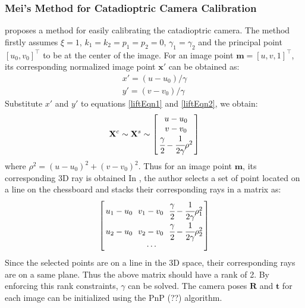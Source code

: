 \documentclass{report}
\begin{document}
\subsubsection{Mei's Method for Catadioptric Camera Calibration}
\cite{mei2007single} proposes a method for easily calibrating the catadioptric camera. The method firstly assumes $\xi = 1$, $k_1 = k_2 = p_1 = p_2 = 0$, $\gamma_1 = \gamma_2$ and the principal point $[u_0, v_0]^\top$ to be at the center of the image. For an image point $\mathbf{m} = [u, v, 1]^\top$, its corresponding normalized image point $\mathbf{x}'$ can be obtained as:
\begin{eqnarray}
x' = (u - u_0) / \gamma \\
y' = (v - v_0) / \gamma
\end{eqnarray}
Substitute $x'$ and $y'$ to equations \ref{liftEqn1} and \ref{liftEqn2}, we obtain: 
\begin{equation}
\mathbf{X}^c \sim \mathbf{X}^s \sim
\arraycolsep=1.5pt%
\begin{bmatrix}
	\begin{array}{c}
	u - u_0 \\ v - v_0 \\ \cfrac{\gamma}{2} - \cfrac{1}{2 \gamma} \rho^2
	\end{array}
\end{bmatrix} 
\end{equation}
where $\rho^2 = (u - u_0)^2 + (v - v_0)^2$. Thus for an image point $\mathbf{m}$, its corresponding 3D ray is obtained In \cite{mei2007single}, the author selects a set of point located on a line on the chessboard and stacks their corresponding rays in a matrix as:
\begin{equation}
\arraycolsep=1.5pt%
\begin{bmatrix}
	\begin{array}{ccc}
	u_1 - u_0\  & v_1 - v_0\  & \cfrac{\gamma}{2} - \cfrac{1}{2 \gamma} \rho_1^2 \\
	u_2 - u_0\  & v_2 - v_0\  & \cfrac{\gamma}{2} - \cfrac{1}{2 \gamma} \rho_2^2 \\
	&\cdots	&
	\end{array}
\end{bmatrix} 
\end{equation}  
Since the selected points are on a line in the 3D space, their corresponding rays are on a same plane. Thus the above matrix should have a rank of 2. By enforcing this rank constraints, $\gamma$ can be solved. The camera poses $\mathbf{R}$ and $\mathbf{t}$ for each image can be initialized using the PnP (??) \cite{} algorithm. 
\end{document}
